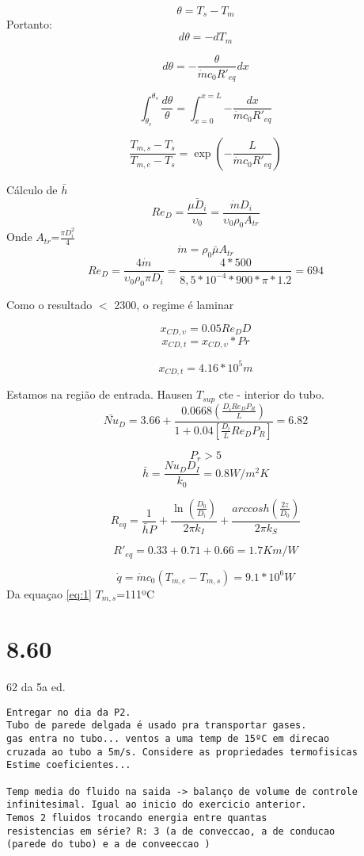 \[\theta = T_{s}-T_{m}\]
Portanto:
\[d\theta = -dT_{m}\]

\[d\theta = -\frac{\theta}{\dot{m}c_{0}R'_{eq}}dx\]

\[\int_{\theta _{e}}^{\theta _{s}}{\frac{d\theta}{\theta}}=\int_{x=0}^{x=L}{-\frac{dx}{\dot{m}c_{0}R'_{eq}}}\]

\begin{equation}
\frac{T_{m,s}-T_{s}}{T_{m,e}-T_{s}}=\exp(-\frac{L}{\dot{m}c_{0}R'_{eq}})
\label{eq:1}
\end{equation}


Cálculo de $\bar{h} $
\[
Re_{D}=\frac{\bar{\mu D_{i}}}{\upsilon _{0}}=\frac{\dot{m} D_{i}}{\upsilon _{0}\rho _{0} A_{tr}}\]
Onde $A_{tr}$=$\frac{\pi D_{i}^{2}}{4}$
\[\dot{m}=\rho _{0} \bar{\mu } A_{tr}\]
\[Re_{D}=\frac{4\dot{m}}{\upsilon _{0} \rho _{0} \pi D_{i}}=\frac{4*500}{8,5*10^{-4}*900*\pi * 1.2}=694\]

Como o resultado $<$ 2300, o regime é laminar

\[x_{CD,\upsilon}=0.05Re_{D}D\]
\[x_{CD,t}=x_{CD,\upsilon}*Pr\]

\[x_{CD,t}=4.16*10^{5}m\]

Estamos na região de entrada. Hausen $T_{sup}$ cte - interior do tubo.
\[\bar{Nu}_{D}=3.66+\frac{0.0668(\frac{D_{i}Re_{D}P_{R}}{L})}{1+0.04[\frac{D_{i}}{L}Re_{D}P_{R}]}=6.82\]

\[P_{r}>5\]
\[\bar{h}=\frac{Nu_{D}D_{I}}{k_{0}}=0.8W/m^{2}K\]

\[R_{eq}=\frac{1}{\bar{h} P}+\frac{\ln(\frac{D_{0}}{D_{i}})}{2\pi  k_{I}}+\frac{arccosh(\frac{2z}{D_{0}})}{2\pi  k_{S}}\]

\[R'_{eq}=0.33+0.71+0.66=1.7Km/W\]

\[\dot{q}=\dot{m}c_{0}(T_{m,e}-T_{m,s})=9.1*10^{6}W\]
Da equaçao \ref{eq:1}  $T_{m,s}$=111ºC

\section{8.60}  62 da 5a ed.



\begin{verbatim}
Entregar no dia da P2.
Tubo de parede delgada é usado pra transportar gases.
gas entra no tubo... ventos a uma temp de 15ºC em direcao
cruzada ao tubo a 5m/s. Considere as propriedades termofisicas
Estime coeficientes...

Temp media do fluido na saida -> balanço de volume de controle 
infinitesimal. Igual ao inicio do exercicio anterior. 
Temos 2 fluidos trocando energia entre quantas
resistencias em série? R: 3 (a de conveccao, a de conducao 
(parede do tubo) e a de conveeccao )
\end{verbatim}

